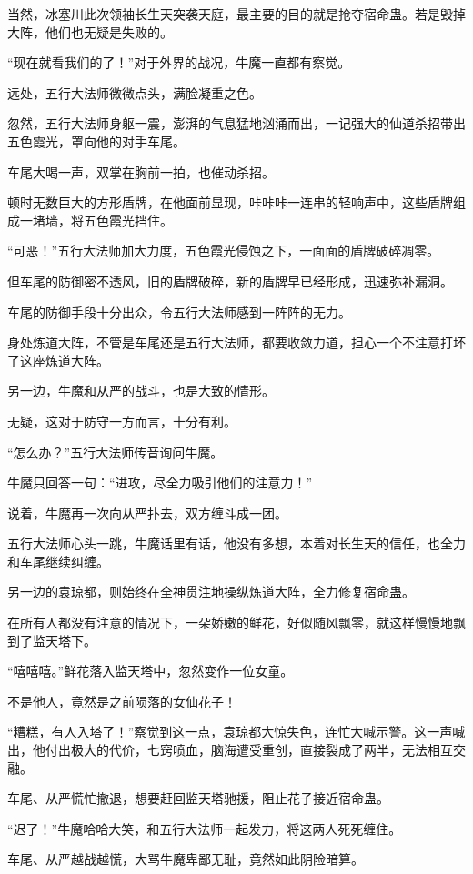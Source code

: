 \begin{this_body}
当然，冰塞川此次领袖长生天突袭天庭，最主要的目的就是抢夺宿命蛊。若是毁掉大阵，他们也无疑是失败的。

“现在就看我们的了！”对于外界的战况，牛魔一直都有察觉。

远处，五行大法师微微点头，满脸凝重之色。

忽然，五行大法师身躯一震，澎湃的气息猛地汹涌而出，一记强大的仙道杀招带出五色霞光，罩向他的对手车尾。

车尾大喝一声，双掌在胸前一拍，也催动杀招。

顿时无数巨大的方形盾牌，在他面前显现，咔咔咔一连串的轻响声中，这些盾牌组成一堵墙，将五色霞光挡住。

“可恶！”五行大法师加大力度，五色霞光侵蚀之下，一面面的盾牌破碎凋零。

但车尾的防御密不透风，旧的盾牌破碎，新的盾牌早已经形成，迅速弥补漏洞。

车尾的防御手段十分出众，令五行大法师感到一阵阵的无力。

身处炼道大阵，不管是车尾还是五行大法师，都要收敛力道，担心一个不注意打坏了这座炼道大阵。

另一边，牛魔和从严的战斗，也是大致的情形。

无疑，这对于防守一方而言，十分有利。

“怎么办？”五行大法师传音询问牛魔。

牛魔只回答一句：“进攻，尽全力吸引他们的注意力！”

说着，牛魔再一次向从严扑去，双方缠斗成一团。

五行大法师心头一跳，牛魔话里有话，他没有多想，本着对长生天的信任，也全力和车尾继续纠缠。

另一边的袁琼都，则始终在全神贯注地操纵炼道大阵，全力修复宿命蛊。

在所有人都没有注意的情况下，一朵娇嫩的鲜花，好似随风飘零，就这样慢慢地飘到了监天塔下。

“嘻嘻嘻。”鲜花落入监天塔中，忽然变作一位女童。

不是他人，竟然是之前陨落的女仙花子！

“糟糕，有人入塔了！”察觉到这一点，袁琼都大惊失色，连忙大喊示警。这一声喊出，他付出极大的代价，七窍喷血，脑海遭受重创，直接裂成了两半，无法相互交融。

车尾、从严慌忙撤退，想要赶回监天塔驰援，阻止花子接近宿命蛊。

“迟了！”牛魔哈哈大笑，和五行大法师一起发力，将这两人死死缠住。

车尾、从严越战越慌，大骂牛魔卑鄙无耻，竟然如此阴险暗算。


\end{this_body}
